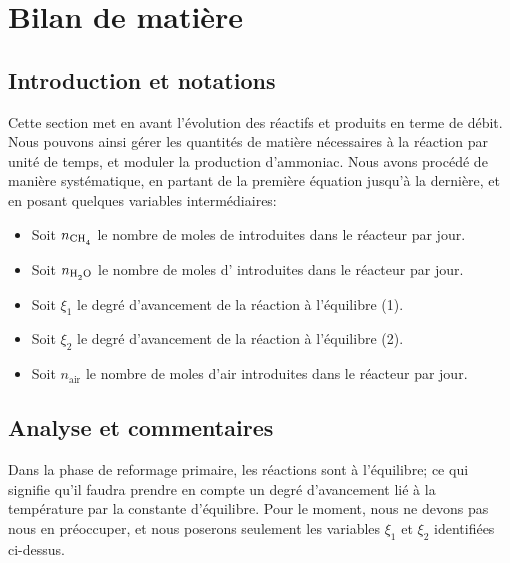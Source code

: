 
\section{Bilan de matière}

\subsection{Introduction et notations}

Cette section met en avant l'évolution des réactifs et produits en terme de débit. 
Nous pouvons ainsi gérer les quantités de matière nécessaires à la réaction par unité de temps, et
moduler la production d'ammoniac. Nous avons procédé de manière systématique, en partant de la première
équation jusqu'à la dernière, et en posant quelques 
variables intermédiaires:

\begin{itemize}
	\item Soit $n_{\ce{CH4}}$ le nombre de moles de  introduites dans le réacteur par jour.
	\item Soit $n_{\ce{H2O}}$ le nombre de moles d' introduites dans le réacteur par jour.
	\item Soit $\xi_1$ le degré d'avancement de la réaction à l'équilibre (1).
	\item Soit $\xi_2$ le degré d'avancement de la réaction à l'équilibre (2).
	\item Soit $n_{\text{air}}$ le nombre de moles d'air introduites dans le réacteur par jour.
\end{itemize}

\subsection{Analyse et commentaires}
Dans la phase de reformage primaire, les réactions sont à l'équilibre; ce qui signifie qu'il faudra prendre en 
compte un degré d'avancement lié à la température par la constante d'équilibre. Pour le moment, nous ne devons pas 
nous en préoccuper, et nous poserons seulement les variables $\xi_1$ et $\xi_2$ identifiées ci-dessus. 

